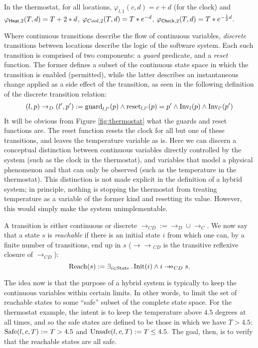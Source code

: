 \documentclass[runningheads]{llncs}
\newcommand{\Exists}[2]{\exists_{#1} \, . \, #2}
\def\phi{\varphi}
\newcommand{\weg}[1]{}
\newcommand{\Heat}{{\sf Heat}}
\newcommand{\Cool}{{\sf Cool}}
\newcommand{\Chec}{{\sf Check}}
\newcommand{\State}{{\rm State}}
\newcommand{\Inv}{{\rm Inv}}
\newcommand{\Init}{{\rm Init}}
\newcommand{\Unsafe}{{\rm Unsafe}}
\newcommand{\Safe}{{\rm Safe}}
\newcommand{\Reach}{{\rm Reach}}
\newcommand{\guard}{{\rm guard}}
\newcommand{\reset}{{\rm reset}}
\newcommand{\trans}{\rightarrow_{CD}}
\newcommand{\doubleheadrightarrow}{\mathrel{\rightarrow\!\!\!\!\rightarrow}}
\newcommand{\ttrans}{\doubleheadrightarrow_{CD}}
\newcommand{\contrans}{\rightarrow_C}
\newcommand{\distrans}{\rightarrow_D}
\begin{document}
In the thermostat, for all locations, $\phi_{l,1}(c,d) = c + d$ (for
the clock) and $\phi_{\Heat,2}(T,d)= T + 2 * d$,
$\phi_{\\Cool,2}(T,d)= T * e^{-d}$, $\phi_{\Chec,2}(T,d)= T * e^{-
  \frac{1}{2}d}$.

Where continuous transitions describe the flow of continuous
variables, \emph{discrete} transitions between locations describe the
logic of the software system. Each such transition is comprised of two
components: a \emph{guard} predicate, and a \emph{reset} function. The
former defines a subset of the continuous state space in which the
transition is enabled (permitted), while the latter describes an
instantaneous change applied as a side effect of the transition, as
seen in the following definition of the discrete transition relation:
$$ (l,p) \distrans (l',p') := \guard_{l,l'}(p) \wedge \reset_{l,l'}(p)= p' \wedge \Inv_l(p) \wedge \Inv_{l'}(p')$$
It will be obvious from Figure \ref{fig:thermostat} what the guards
and reset functions are. The reset function resets the clock for all
but one of these transitions, and leaves the temperature variable as
is. Here we can discern a conceptual distinction between continuous
variables directly controlled by the system (such as the clock in the
thermostat), and variables that model a physical phenomenon and that
can only be observed (such as the temperature in the thermostat). This
distinction is not made explicit in the definition of a hybrid system;
in principle, nothing is stopping the thermostat from treating
temperature as a variable of the former kind and resetting its
value. However, this would simply make the system unimplementable.


A transition is either continuous or discrete $\trans:= \distrans \cup \contrans$. We now say that a state $s$ is \emph{reachable} if there is an initial state $i$ from which one can, by a finite number of transitions, end up in $s$ ($\ttrans$ is the transitive reflexive closure of $\trans$):
$$\Reach(s):=
    \Exists{i\in \State}{\Init(i) \wedge i \ttrans s}.$$
\weg{As mentioned before, the set of reachable states represents the
possible behaviours exhibited by a hypothetical real-world
implementation of the hybrid system (as software running on a device
with sensors and actuators).
}

The idea now is that the purpose of a hybrid system is typically to
keep the continuous variables within certain limits. In other words,
to limit the set of reachable states to some ``safe'' subset of the
complete state space. For the thermostat example, the intent is to
keep the temperature above $4.5$ degrees at all times, and so the safe
states are defined to be those in which we have $T > 4.5$: $\Safe(l,c,T) := T >4.5$ and $\Unsafe(l,c,T) := T\leq 4.5.$
The goal, then, is to verify that the reachable states are all safe.
\end{document}
